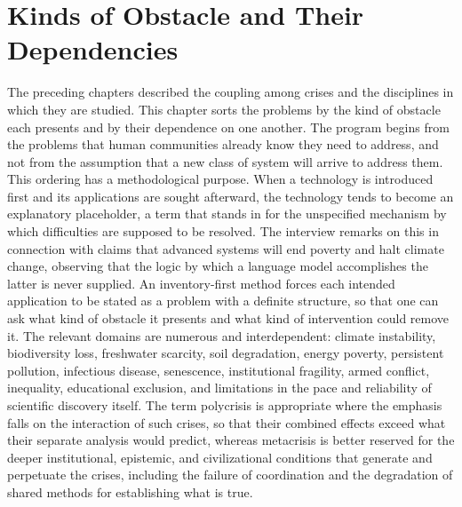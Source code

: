 \chapter{Kinds of Obstacle and Their Dependencies}
\label{ch:05}

The preceding chapters described the coupling among crises and the disciplines in which they are studied. This chapter sorts the problems by the kind of obstacle each presents and by their dependence on one another. The program begins from the problems that human communities already know they need to address, and not from the assumption that a new class of system will arrive to address them. This ordering has a methodological purpose. When a technology is introduced first and its applications are sought afterward, the technology tends to become an explanatory placeholder, a term that stands in for the unspecified mechanism by which difficulties are supposed to be resolved. The interview remarks on this in connection with claims that advanced systems will end poverty and halt climate change, observing that the logic by which a language model accomplishes the latter is never supplied. An inventory-first method forces each intended application to be stated as a problem with a definite structure, so that one can ask what kind of obstacle it presents and what kind of intervention could remove it. The relevant domains are numerous and interdependent: climate instability, biodiversity loss, freshwater scarcity, soil degradation, energy poverty, persistent pollution, infectious disease, senescence, institutional fragility, armed conflict, inequality, educational exclusion, and limitations in the pace and reliability of scientific discovery itself. The term polycrisis is appropriate where the emphasis falls on the interaction of such crises, so that their combined effects exceed what their separate analysis would predict, whereas metacrisis is better reserved for the deeper institutional, epistemic, and civilizational conditions that generate and perpetuate the crises, including the failure of coordination and the degradation of shared methods for establishing what is true.

